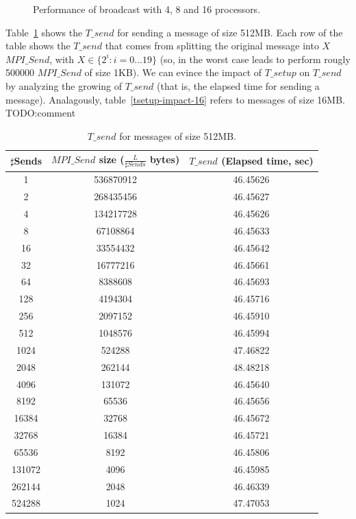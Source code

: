 \begin{figure}[p]
	\caption{Performance of broadcast with 4, 8 and 16 processors.}
	\label{pianosa-mpi-3}
\end{figure}

Table~\ref{tsetup-impact} shows the $T\_send$ for sending a message of size 512MB. Each row of the table shows the $T\_send$ that comes from splitting the original message into $X$ $MPI\_Send$, with $X \in \lbrace 2^i : i = 0...19 \rbrace$ (so, in the worst case leads to perform rougly 500000 $MPI\_Send$ of size 1KB). We can evince the impact of $T\_setup$ on $T\_send$ by analyzing the growing of $T\_send$ (that is, the elapsed time for sending a message). Analagously, table~\ref{tsetup-impact-16} refers to messages of size 16MB. TODO:comment
\begin{table}[h]
\begin{center}
\begin{tabular}{|c|c|c|}\hline
\hline
$\sharp$Sends          & $MPI\_Send$ size ($\frac{L}{\sharp Sends}$ bytes)          & $T\_send$ (Elapsed time, sec)      \\\hline\hline
1 & 536870912 & 46.45626 \\\hline
2 & 268435456 & 46.45627 \\\hline
4 & 134217728 & 46.45626 \\\hline
8 & 67108864 & 46.45633 \\\hline
16 & 33554432 & 46.45642 \\\hline
32 & 16777216 & 46.45661 \\\hline
64 & 8388608 & 46.45693 \\\hline
128 & 4194304 & 46.45716 \\\hline
256 & 2097152 & 46.45910 \\\hline
512 & 1048576 & 46.45994 \\\hline
1024 & 524288 & 47.46822 \\\hline
2048 & 262144 & 48.48218 \\\hline
4096 & 131072 & 46.45640 \\\hline
8192 & 65536 & 46.45656 \\\hline
16384 & 32768 & 46.45672 \\\hline
32768 & 16384 & 46.45721 \\\hline
65536 & 8192 & 46.45806 \\\hline
131072 & 4096 & 46.45985 \\\hline
262144 & 2048 & 46.46339 \\\hline
524288 & 1024 & 47.47053 \\\hline
\hline
\end{tabular}
\caption{$T\_send$ for messages of size 512MB. }
\label{tsetup-impact}
\end{center}
\end{table}

